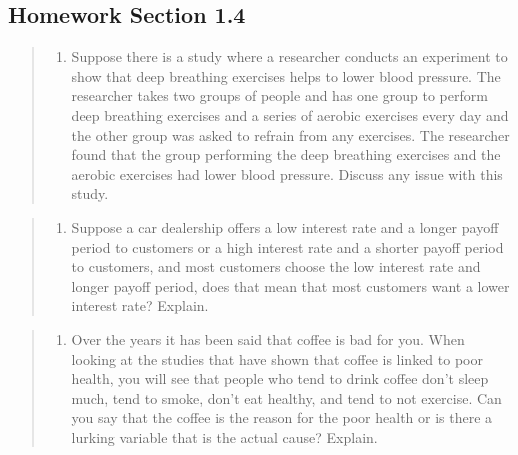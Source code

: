 \documentclass[]{book}
\providecommand{\tightlist}{%
  \setlength{\itemsep}{0pt}\setlength{\parskip}{0pt}}
\begin{document}
\hypertarget{homework-section-1.4}{%
\subsection{Homework Section 1.4}\label{homework-section-1.4}}

\begin{quote}
\begin{enumerate}
\def\labelenumi{\arabic{enumi}.}
\tightlist
\item
  Suppose there is a study where a researcher conducts an experiment to show that deep breathing exercises helps to lower blood pressure. The researcher takes two groups of people and has one group to perform deep breathing exercises and a series of aerobic exercises every day and the other group was asked to refrain from any exercises. The researcher found that the group performing the deep breathing exercises and the aerobic exercises had lower blood pressure. Discuss any issue with this study.
\end{enumerate}
\end{quote}

\begin{quote}
\begin{enumerate}
\def\labelenumi{\arabic{enumi}.}
\setcounter{enumi}{1}
\tightlist
\item
  Suppose a car dealership offers a low interest rate and a longer payoff period to customers or a high interest rate and a shorter payoff period to customers, and most customers choose the low interest rate and longer payoff period, does that mean that most customers want a lower interest rate? Explain.
\end{enumerate}
\end{quote}

\begin{quote}
\begin{enumerate}
\def\labelenumi{\arabic{enumi}.}
\setcounter{enumi}{2}
\tightlist
\item
  Over the years it has been said that coffee is bad for you. When looking at the studies that have shown that coffee is linked to poor health, you will see that people who tend to drink coffee don't sleep much, tend to smoke, don't eat healthy, and tend to not exercise. Can you say that the coffee is the reason for the poor health or is there a lurking variable that is the actual cause? Explain.
\end{enumerate}
\end{quote}
\end{document}
